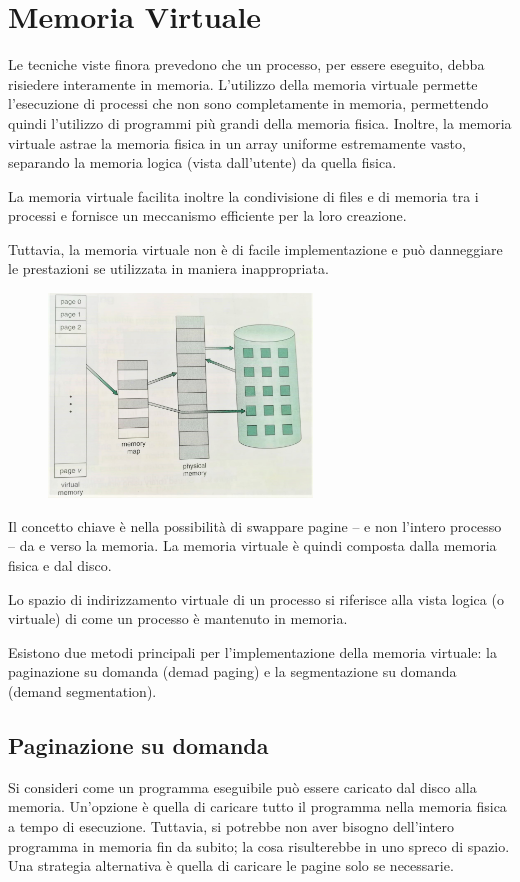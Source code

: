 \documentclass[a4paper]{article}
\begin{document}
\section{Memoria Virtuale}
Le tecniche viste finora prevedono che un processo, per essere eseguito, debba risiedere interamente in memoria. L'utilizzo della memoria virtuale permette l'esecuzione di processi che non sono completamente in memoria, permettendo quindi l'utilizzo di programmi più grandi della memoria fisica. Inoltre, la memoria virtuale astrae la memoria fisica in un array uniforme estremamente vasto, separando la memoria logica (vista dall'utente) da quella fisica.

La memoria virtuale facilita inoltre la condivisione di files e di memoria tra i processi e fornisce un meccanismo efficiente per la loro creazione.

Tuttavia, la memoria virtuale non è di facile implementazione e può danneggiare le prestazioni se utilizzata in maniera inappropriata.

\begin{figure}
    \includegraphics[width=7cm]{img/virtmem.jpeg}
\end{figure}
Il concetto chiave è nella possibilità di swappare pagine -- e non l'intero processo -- da e verso la memoria. La memoria virtuale è quindi composta dalla memoria fisica e dal disco.

Lo spazio di indirizzamento virtuale di un processo si riferisce alla vista logica (o virtuale) di come un processo è mantenuto in memoria.

Esistono due metodi principali per l'implementazione della memoria virtuale: la paginazione su domanda (demad paging) e la segmentazione su domanda (demand segmentation).

\subsection{Paginazione su domanda}
Si consideri come un programma eseguibile può essere caricato dal disco alla memoria. Un'opzione è quella di caricare tutto il programma nella memoria fisica a tempo di esecuzione. Tuttavia, si potrebbe non aver bisogno dell'intero programma in memoria fin da subito; la cosa risulterebbe in uno spreco di spazio. Una strategia alternativa è quella di caricare le pagine solo se necessarie.
\end{document}
